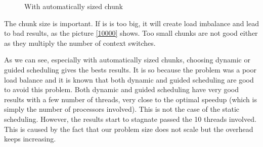 \begin{figure}[!h]
  \begin{center}
  \end{center}
  \caption{With automatically sized chunk}
  \label{opt}
\end{figure}


The chunk size is important. If is is too big, it will create load imbalance and lead to bad results, as the picture \ref{10000} shows. Too small chunks are not good either as they multiply the number of context switches. 

As we can see, especially with automatically sized chunks,  choosing dynamic or guided scheduling gives the bests results. It is so because the problem was a poor load balance and it is known that both dynamic and guided scheduling are good to avoid this problem. Both dynamic and guided scheduling have very good results with a few number of threads, very close to the optimal speedup (which is simply the number of processors involved). This is not the case of the static scheduling. However, the results start to stagnate passed the 10 threads involved. This is caused by the fact that our problem size does not scale but the overhead keeps increasing.

